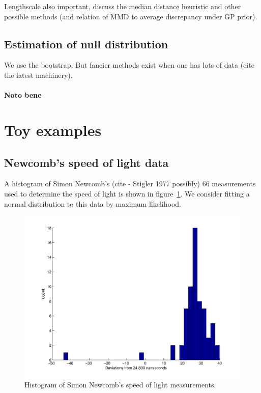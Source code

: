 \documentclass{article}
\begin{document}
Lengthscale also important, discuss the median distance heuristic and other possible methods (and relation of MMD to average discrepancy under GP prior).

\subsection{Estimation of null distribution}

We use the bootstrap.
But fancier methods exist when one has lots of data (cite the latest machinery).

\paragraph{Noto bene}


\section{Toy examples}

\subsection{Newcomb's speed of light data}


A histogram of Simon Newcomb's (cite - Stigler 1977 possibly) 66 measurements used to determine the speed of light is shown in figure~\ref{fig:newcomb_hist}.
We consider fitting a normal distribution to this data by maximum likelihood\footnotemark.

\begin{figure}[ht]
\centering
\includegraphics[width=0.98\columnwidth]{figures/newcomb_hist}
\caption{
Histogram of Simon Newcomb's speed of light measurements.
}
\label{fig:newcomb_hist}
\end{figure}
\end{document}
